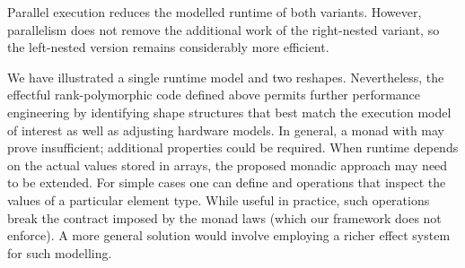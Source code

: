 Parallel execution reduces the modelled runtime of both variants.  However,
parallelism does not remove the additional work of the right-nested variant,
so the left-nested version remains considerably more efficient.

We have illustrated a single runtime model and two reshapes.  Nevertheless, the
effectful rank-polymorphic code defined above permits further performance
engineering by identifying shape structures that best match the execution model
of interest as well as adjusting hardware models.  In general, a monad with
 may prove insufficient; additional properties could be required.
When runtime depends on the actual values stored in arrays, the proposed
monadic approach may need to be extended.  For simple cases one can define
 and \AF{\_>>=\_} operations that inspect the values of a
particular element type.  While useful in practice, such operations break the
contract imposed by the monad laws (which our framework does not enforce).  A
more general solution would involve employing a richer effect system for such
modelling.

